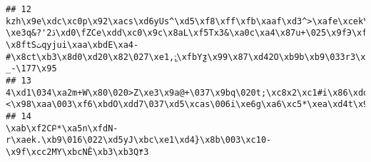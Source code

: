 \documentclass[
]{article}
\begin{document}
\begin{verbatim}
## 12 kzh\x9e\xdc\xc0p\x92\xacs\xd6yUs^\xd5\xf8\xff\xfb\xaaf\xd3^>\xafe\xcek\x99\xf3Z\xc6\xf5\xf6\xf5Aj\x99\xbc|\x81\xca&\xef\xf2\xe8\x9eO\xbc\xb1\xe53!\x94\xee\xcb\005ŻBw}\004\xbcь\a0\xa8\xdbQ\xba'\xb9j\001\xce\xf8\x9a5\x98,ܔ#-\xe3q&?'2ڏ\xd0\fZCe\xdd\xc0\x9c\x8aL\xf5Tx3&\xa0c\xa4\x87u+\025\x9fЭ\xfbN\xf3x\x8f\x8d\xd3Ng\xb9\xac\xba\x9a\xa9\v\005\x92\xf9x)\\\x8dC\x97J\xa6\xe8Z=\xefޭ\xd4\xeb~\xe8TwY\x97\006(\xd9\xd3\030aLf\033Qu\030Q_\016B\024^g\x84^ٙX\xd1tX\xd1PꗡZFq\xe5\n0m\025\025x\xe5\xf6\xe0E\xbd\xe5\x87A\xdaA\x86f\034\x94\xe7c\025\xa7\xb4\x99\xbc\x8c\xae\nΙFz\x933\xa9\x99\001Pb/3 \x8ftSٺqyjui\xaa\xbdE\xa4-#\x8ct\xb3\x8d0\xd20\x82\027\xe1,;͖\xfbYƺ\x99\x87\xd42O\xb9b\xb9\033r3\xea\x8d\017\021kE'\xb8\x81&&S\xd0\xc4;n\xf9\xb5j\b\xb7*#4k\xf9\023\xe8\030\xc3\xd7x\006\xb9#\xd4[\027\xa2S\xb8v\031I\x9en\xf8wa\x96\031\027\xb2\x87D\x94:\\\x93N\xca\0061\x91\x98{\x94\xc4-_-\177\x95
## 13                                                                                                                                                                                                                                                                                                                                                                                                                                                                           4\xd1\034\xa2m+W\x80\020>Z\xe3\x9a@+\037\x9bq\020t;\xc8x2\xc1#i\x86\xdd\030Q\x9eN\037\x81\xe1S\xaep\xfe\xaa\xc5\xdf\035\xac$\xd9\034½\037\x8d\x8f\xbd\003:\xe77\021\xa4XX/+\a\x8e\x89\x80\x8b\x83r\xea\xcd1\x81\x9b\xb0\025\x91\xe5\xf9w\xe2`\xcah\u05fc\x8a\xd29\x94\x8e#:\x8bPv\xa2\x98d\x9e\xc25\x89\xae\xcc\xd1O+\037\030Oٚ\xc1\xa1\xeb.<\x98\xaa\003\xf6\xbdO\xdd7\037\xd5\xcas\006i\xe6g\xa6\xc5*\xea\xd4t\x93\xe9\x87;\xe4
## 14                                                                                                                                                                                                                                                                                                                                                                                                                                                                                                                                                                                                                                                                                                                                                                                                     \xab\xf2CԲ*\xa5n\xfdN-r\xaek.\xb9\016\022\xd5yJ\xbc\xe1\xd4}\x8b\003\xc10-\x9f\xcc2MY\xbcNÊ\xb3\xb3Q۴3

\end{verbatim}
\end{document}
